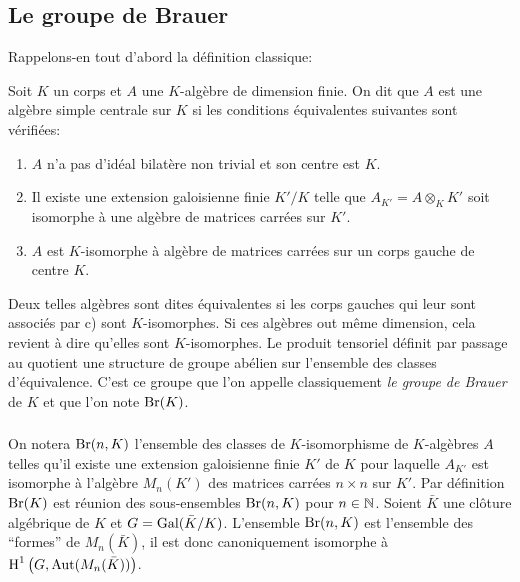 \documentclass[oneside]{book}
\begin{document}
\subsection{Le groupe de Brauer}\label{I:3-1}

Rappelons-en tout d'abord la définition classique:





\begin{definition}\label{I:3-1-1}
Soit $K$ un corps et $A$ une $K$-algèbre de dimension finie. On dit que $A$ 
est une algèbre simple centrale sur $K$ si les conditions équivalentes 
suivantes sont vérifiées:
\begin{enumerate}[\indent a)]
  \item $A$ n'a pas d'idéal bilatère non trivial et son centre est $K$. 
  \item Il existe une extension galoisienne finie $K'/K$ telle que 
    $A_{K'} = A\otimes_K K'$ soit isomorphe à une algèbre de matrices 
    carrées sur $K'$.
  \item $A$ est $K$-isomorphe à algèbre de matrices carrées sur un corps 
    gauche de centre $K$.
\end{enumerate}
\end{definition}

Deux telles algèbres sont dites équivalentes si les corps gauches qui 
leur sont associés par c) sont $K$-isomorphes. Si ces algèbres out 
même dimension, cela revient à dire qu'elles sont $K$-isomorphes. Le 
produit tensoriel définit par passage au quotient une structure de groupe 
abélien sur l'ensemble des classes d'équivalence. C'est ce groupe que l'on 
appelle classiquement \emph{le groupe de Brauer} de $K$ et que l'on note 
$\operatorname{Br}(K)$. 





\subsubsection{}\label{I:3-1-2}

On notera $\operatorname{Br}(n,K)$ l'ensemble des classes de $K$-isomorphisme de 
$K$-algèbres $A$ telles qu'il existe une extension galoisienne finie $K'$ de 
$K$ pour laquelle $A_{K'}$ est isomorphe à l'algèbre $M_n(K')$ des matrices 
carrées $n\times n$ sur $K'$. Par définition $\operatorname{Br}(K)$ est réunion des 
sous-ensembles $\operatorname{Br}(n,K)$ pour $n\in\mathbb{N}$. Soient $\bar K$ une clôture 
algébrique de $K$ et $G=\operatorname{Gal}(\bar K/K)$. L'ensemble $\operatorname{Br}(n,K)$ est 
l'ensemble des ``formes'' de $M_n(\bar K)$, il est donc canoniquement 
isomorphe à $\operatorname{H}^1\left(G,\operatorname{Aut}(M_n(\bar K))\right)$. 
\end{document}

